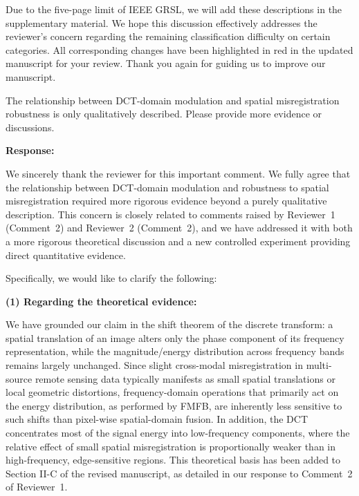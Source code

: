 Due to the five-page limit of IEEE GRSL, we will add these descriptions in the supplementary material. We hope this discussion effectively addresses the reviewer's concern regarding the remaining classification difficulty on certain categories. All corresponding changes have been highlighted in red in the updated manuscript for your review. Thank you again for guiding us to improve our manuscript.

\vspace{2em}



\begin{tcolorbox}[title={Reviewer \#3, Comment \#4}] 
  \vspace{1em}
  
  \color{blue}
  The relationship between DCT-domain modulation and spatial misregistration robustness is only qualitatively described. Please provide more evidence or discussions.

  \vspace{1em}
\end{tcolorbox}

\textbf{Response:}

We sincerely thank the reviewer for this important comment. We fully agree that the relationship between DCT-domain modulation and robustness to spatial misregistration required more rigorous evidence beyond a purely qualitative description. This concern is closely related to comments raised by Reviewer~1 (Comment~2) and Reviewer~2 (Comment~2), and we have addressed it with both a more rigorous theoretical discussion and a new controlled experiment providing direct quantitative evidence.

Specifically, we would like to clarify the following:

\textbf{(1) Regarding the theoretical evidence:}

We have grounded our claim in the shift theorem of the discrete transform: a spatial translation of an image alters only the phase component of its frequency representation, while the magnitude/energy distribution across frequency bands remains largely unchanged. Since slight cross-modal misregistration in multi-source remote sensing data typically manifests as small spatial translations or local geometric distortions, frequency-domain operations that primarily act on the energy distribution, as performed by FMFB, are inherently less sensitive to such shifts than pixel-wise spatial-domain fusion. In addition, the DCT concentrates most of the signal energy into low-frequency components, where the relative effect of small spatial misregistration is proportionally weaker than in high-frequency, edge-sensitive regions. This theoretical basis has been added to Section II-C of the revised manuscript, as detailed in our response to Comment~2 of Reviewer~1.

